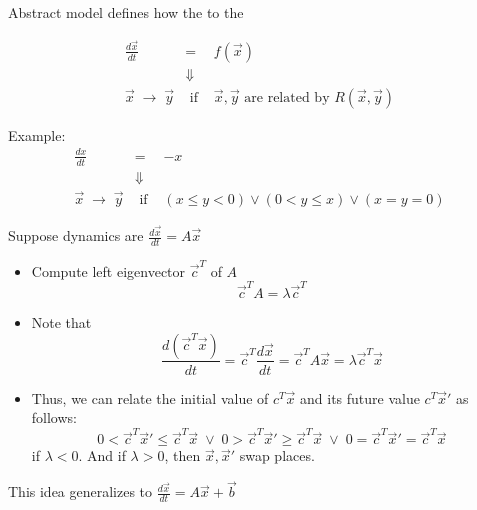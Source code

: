 \documentclass{seminar}
\begin{document}
\begin{slide}

Abstract model defines how the {}
{} to the {}

\begin{eqnarray}
 \frac{d\vec{x}}{dt} & = & f(\vec{x})
\\ & \Downarrow &
\\ 
 \vec{x}\;\rightarrow\;\vec{y} & \mbox{ if } &
 \vec{x},\vec{y} \mbox{ are related by } R(\vec{x},\vec{y})
\end{eqnarray}

\bigskip
Example:
\begin{eqnarray}
 \frac{dx}{dt} & = & -x
\\ & \Downarrow &
\\ 
 \vec{x}\;\rightarrow\;\vec{y} & \mbox{ if } &
(x \leq y < 0) \vee (0 < y \leq x) \vee (x = y = 0)
\end{eqnarray}

\end{slide}
\begin{slide}

Suppose dynamics are $\frac{d\vec{x}}{dt} = A\vec{x}$

\begin{itemize}
\item Compute left eigenvector $\vec{c}^T$ of $A$
$$  \vec{c}^T A  = \lambda \vec{c}^T $$
\item
 Note that 
$$
 \frac{d(\vec{c}^T \vec{x})}{dt} =
 \vec{c}^T\frac{d\vec{x}}{dt} =
 \vec{c}^T A\vec{x} = \lambda \vec{c}^T\vec{x}
$$
\item
 Thus, we can relate the initial value of $c^T\vec{x}$ 
 and its future value $c^T\vec{x}'$ as follows:
$$
 0 < \vec{c}^T\vec{x}' \leq \vec{c}^T\vec{x}  \;\vee\;
 0 > \vec{c}^T\vec{x}' \geq \vec{c}^T\vec{x}  \;\vee\;
 0 = \vec{c}^T\vec{x}' = \vec{c}^T\vec{x}
$$
if $\lambda < 0$.  And if $\lambda > 0$, then $\vec{x},\vec{x}'$ swap places.
\end{itemize}

This idea generalizes to $\frac{d\vec{x}}{dt} = A\vec{x} + \vec{b}$

\end{slide}
\end{document}
